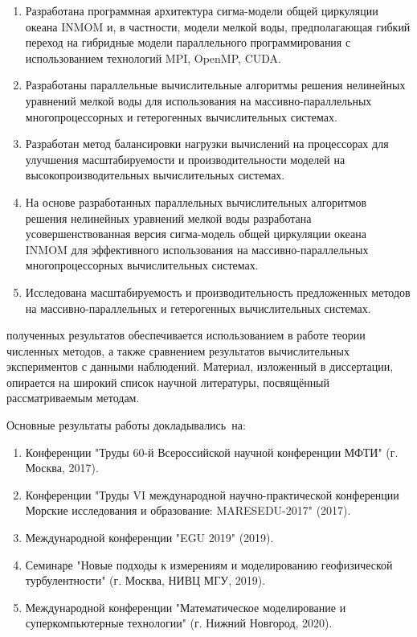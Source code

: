 {}
\begin{enumerate}[beginpenalty=10000] %
    \item Разработана программная архитектура сигма-модели общей циркуляции океана INMOM и, в частности, модели мелкой воды, предполагающая гибкий переход на гибридные модели параллельного программирования с использованием технологий MPI, OpenMP, CUDA.    
    \item Разработаны параллельные вычислительные алгоритмы решения нелинейных уравнений мелкой воды для использования на массивно-параллельных многопроцессорных и гетерогенных вычислительных системах.
    \item Разработан метод балансировки нагрузки вычислений на процессорах для улучшения масштабируемости и производительности моделей на высокопроизводительных вычислительных системах.
    \item На основе разработанных параллельных вычислительных алгоритмов решения нелинейных уравнений мелкой воды разработана усовершенствованная версия сигма-модель общей циркуляции океана INMOM для эффективного использования на массивно-параллельных многопроцессорных вычислительных системах.
    \item Исследована масштабируемость и производительность предложенных методов на массивно-параллельных и гетерогенных вычислительных системах.     
\end{enumerate}

{\reliability} полученных результатов обеспечивается использованием в работе теории численных методов, а также сравнением результатов вычислительных экспериментов с данными наблюдений. Материал, изложенный в диссертации, опирается на широкий список научной литературы, посвящённый рассматриваемым методам.

{\probation}
Основные результаты работы докладывались~на:
\begin{enumerate}[beginpenalty=10000]
\item Конференции "Труды 60-й Всероссийской научной конференции МФТИ" (г. Москва, 2017).
\item Конференции "Труды VI международной научно-практической конференции Морские исследования и образование: MARESEDU-2017" (2017).
\item Международной конференции "EGU 2019" (2019).
\item Семинаре "Новые подходы к измерениям и моделированию геофизической турбулентности" (г. Москва, НИВЦ МГУ, 2019).
\item Международной конференции "Математическое моделирование и суперкомпьютерные технологии" (г. Нижний Новгород, 2020).
\end{enumerate}

